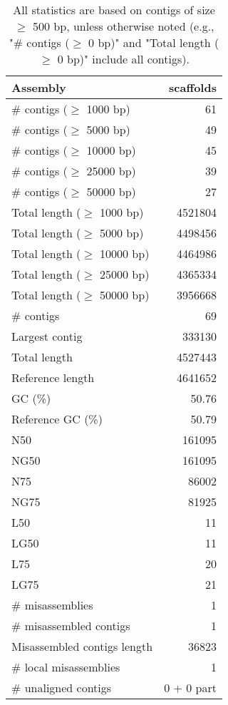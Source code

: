 \documentclass[12pt,a4paper]{article}
\begin{document}
\begin{table}[ht]
\begin{center}
\caption{All statistics are based on contigs of size $\geq$ 500 bp, unless otherwise noted (e.g., "\# contigs ($\geq$ 0 bp)" and "Total length ($\geq$ 0 bp)" include all contigs).}
\begin{tabular}{|l*{1}{|r}|}
\hline
Assembly & scaffolds \\ \hline
\# contigs ($\geq$ 1000 bp) & 61 \\ \hline
\# contigs ($\geq$ 5000 bp) & 49 \\ \hline
\# contigs ($\geq$ 10000 bp) & 45 \\ \hline
\# contigs ($\geq$ 25000 bp) & 39 \\ \hline
\# contigs ($\geq$ 50000 bp) & 27 \\ \hline
Total length ($\geq$ 1000 bp) & 4521804 \\ \hline
Total length ($\geq$ 5000 bp) & 4498456 \\ \hline
Total length ($\geq$ 10000 bp) & 4464986 \\ \hline
Total length ($\geq$ 25000 bp) & 4365334 \\ \hline
Total length ($\geq$ 50000 bp) & 3956668 \\ \hline
\# contigs & 69 \\ \hline
Largest contig & 333130 \\ \hline
Total length & 4527443 \\ \hline
Reference length & 4641652 \\ \hline
GC (\%) & 50.76 \\ \hline
Reference GC (\%) & 50.79 \\ \hline
N50 & 161095 \\ \hline
NG50 & 161095 \\ \hline
N75 & 86002 \\ \hline
NG75 & 81925 \\ \hline
L50 & 11 \\ \hline
LG50 & 11 \\ \hline
L75 & 20 \\ \hline
LG75 & 21 \\ \hline
\# misassemblies & 1 \\ \hline
\# misassembled contigs & 1 \\ \hline
Misassembled contigs length & 36823 \\ \hline
\# local misassemblies & 1 \\ \hline
\# unaligned contigs & 0 + 0 part \\ \hline

\end{tabular}
\end{center}
\end{table}
\end{document}
